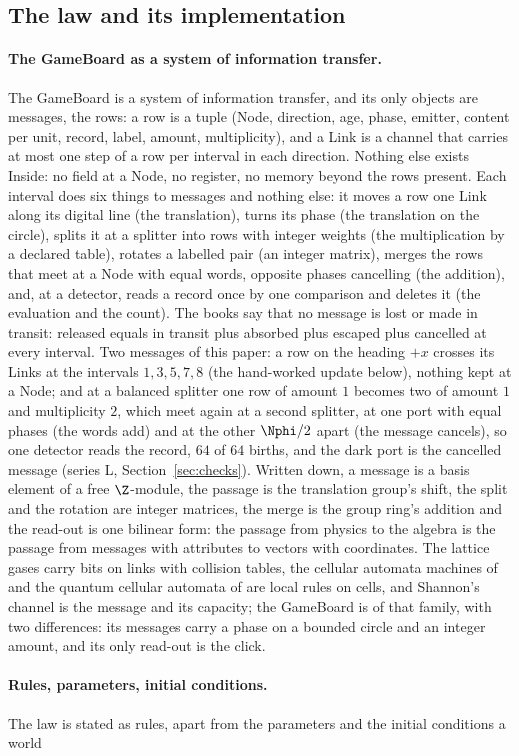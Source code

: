 \subsection{The law and its implementation}\label{sec:law}  \paragraph{The GameBoard as a system of information transfer.} The GameBoard is a system of information transfer, and its only objects are messages, the rows: a row is a tuple (Node, direction, age, phase, emitter, content per unit, record, label, amount, multiplicity), and a Link is a channel that carries at most one step of a row per interval in each direction. Nothing else exists Inside: no field at a Node, no register, no memory beyond the rows present. Each interval does six things to messages and nothing else: it moves a row one Link along its digital line (the translation), turns its phase (the translation on the circle), splits it at a splitter into rows with integer weights (the multiplication by a declared table), rotates a labelled pair (an integer matrix), merges the rows that meet at a Node with equal words, opposite phases cancelling (the addition), and, at a detector, reads a record once by one comparison and deletes it (the evaluation and the count). The books say that no message is lost or made in transit: released equals in transit plus absorbed plus escaped plus cancelled at every interval. Two messages of this paper: a row on the heading $+x$ crosses its Links at the intervals $1, 3, 5, 7, 8$ (the hand-worked update below), nothing kept at a Node; and at a balanced splitter one row of amount $1$ becomes two of amount $1$ and multiplicity $2$, which meet again at a second splitter, at one port with equal phases (the words add) and at the other $\Nphi/2$ apart (the message cancels), so one detector reads the record, $64$ of $64$ births, and the dark port is the cancelled message (series L, Section~\ref{sec:checks}). Written down, a message is a basis element of a free $\Z$-module, the passage is the translation group's shift, the split and the rotation are integer matrices, the merge is the group ring's addition and the read-out is one bilinear form: the passage from physics to the algebra is the passage from messages with attributes to vectors with coordinates. The lattice gases \cite{hpp1976,fhp1986} carry bits on links with collision tables, the cellular automata machines of \cite{toffoli1987} and the quantum cellular automata of \cite{arrighi2019} are local rules on cells, and Shannon's channel \cite{shannon1948} is the message and its capacity; the GameBoard is of that family, with two differences: its messages carry a phase on a bounded circle and an integer amount, and its only read-out is the click.  \paragraph{Rules, parameters, initial conditions.} The law is stated as rules, apart from the parameters and the initial conditions a world
